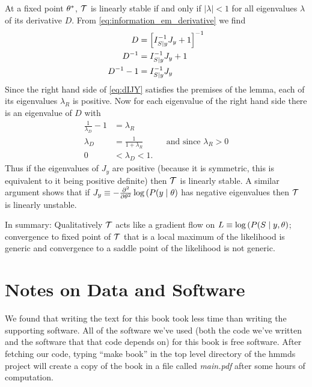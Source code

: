 At a fixed point ${\theta^*}$, $\EMmap$ is linearly stable if and
only if $\left| \lambda \right| < 1$ for all eigenvalues $\lambda$ of
its derivative $D$.  From \eqref{eq:information_em_derivative} we find
\begin{align}
  \nonumber
  D &= \left[I_{S \mid y}^{-1} J_y + 1 \right]^{-1} \\
  \nonumber
  D^{-1} &= I_{S \mid y}^{-1} J_y + 1 \\
  \label{eq:dIJY}
  D^{-1} -1  &= I_{S \mid y}^{-1} J_y
\end{align}
Since the right hand side of \eqref{eq:dIJY} satisfies the premises of
the lemma, each of its eigenvalues $\lambda_R$ is positive.  Now for
each eigenvalue of the right hand side there is an eigenvalue of $D$
with
\begin{align}
  \nonumber
  \frac{1}{\lambda_D} - 1 &= \lambda_R  \\
  \nonumber
  \lambda_D &= \frac{1}{1+\lambda_R} &&\text{and since } \lambda_R >0 \\
  \label{eq:D_is_stable}
  0 &< \lambda_D < 1.
\end{align}
Thus if the eigenvalues of $J_y$ are positive (because it is
symmetric, this is equivalent to it being positive definite) then
$\EMmap$ is linearly stable.  A similar argument shows that if
$J_y\equiv-\frac{\partial^2}{\partial \theta^2} \log \left( P(y \mid
  \theta \right)$ has negative eigenvalues then $\EMmap$ is linearly
unstable.

In summary: Qualitatively $\EMmap$ acts like a gradient flow on
$L\equiv\log \left( P(S \mid y, \theta \right)$;  convergence to
fixed point of $\EMmap$ that is a local maximum of the likelihood is
generic and convergence to a saddle point of the likelihood is not
generic.

\chapter{Notes on Data and Software}
\label{cha:Software}

We found that writing the text for this book took less time than
writing the supporting software.  All of the software we've used (both
the code we've written and the software that that code depends on) for
this book is free software.  After fetching our code, typing ``make
book'' in the top level directory of the hmmds project will create a
copy of the book in a file called \emph{main.pdf} after some hours of
computation.  

